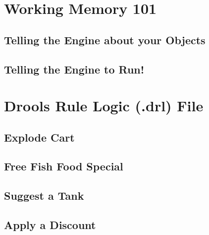 \clearpage
\section{Working Memory 101}

\subsection{Telling the Engine about your Objects}

\subsection{Telling the Engine to Run!}




\clearpage
\section{Drools Rule Logic (.drl) File}
\subsection{Explode Cart}
\subsection{Free Fish Food Special}

\clearpage
\subsection{Suggest a Tank}
\subsection{Apply a Discount}
\clearpage

